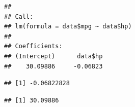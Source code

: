 \begin{verbatim}
## 
## Call:
## lm(formula = data$mpg ~ data$hp)
## 
## Coefficients:
## (Intercept)      data$hp  
##    30.09886     -0.06823
\end{verbatim}

\begin{Shaded}
\begin{Highlighting}[]

\StringTok{ }\OperatorTok{$}\OperatorTok{$}

\StringTok{ }\OperatorTok{$}

\StringTok{ }\OperatorTok{/}

\end{Highlighting}
\end{Shaded}

\begin{verbatim}
## [1] -0.06822828
\end{verbatim}

\begin{Shaded}
\begin{Highlighting}[]

\StringTok{ }\OperatorTok{$}
\StringTok{ }\OperatorTok{$}

\StringTok{ }\OperatorTok{-}\StringTok{ }\OperatorTok{*}\StringTok{ }

\end{Highlighting}
\end{Shaded}

\begin{verbatim}
## [1] 30.09886
\end{verbatim}

\begin{Shaded}
\begin{Highlighting}[]
\end{Highlighting}
\end{Shaded}

